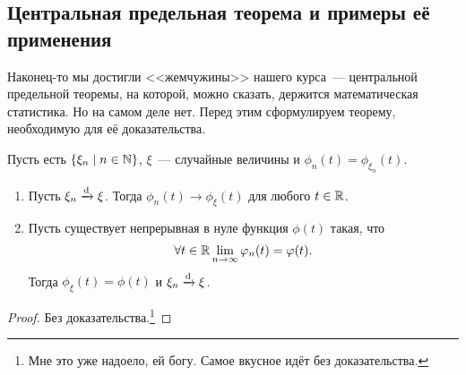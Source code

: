 \subsection{Центральная предельная теорема и примеры её применения}
Наконец-то мы достигли <<жемчужины>> нашего курса~--- центральной предельной 
теоремы, на которой, можно сказать, держится математическая статистика. Но на 
самом деле нет. Перед этим сформулируем теорему, необходимую для её 
доказательства.
\begin{theorem}[непрерывности]
	Пусть есть \(\{\xi_{n} \mid n \in \mathbb{N}\}\), \(\xi\)~--- случайные величины и 
	\(\phi_{n}(t) = \phi_{\xi_n}(t)\).
	\begin{enumerate}
		\item Пусть \(\xi_{n} \xrightarrow{\mathrm{d}} \xi\). Тогда \(\phi_{n}(t) \to 
		\phi_{\xi}(t)\) для любого \(t \in \mathbb{R}\).
		\item Пусть существует непрерывная в нуле функция \(\phi(t)\) такая, что
		\[
			\forall t \in \mathbb{R} \lim\limits_{n \to \infty} \varphi_{n}(t) = \varphi(t).
		\]
		Тогда \(\phi_{\xi}(t) = \phi(t)\) и \(\xi_{n} \xrightarrow{\mathrm{d}} \xi\).
	\end{enumerate}
\end{theorem}
\begin{proof}
	Без доказательства.\footnote{Мне это уже надоело, ей богу. Самое вкусное 
	идёт без доказательства.}
\end{proof}

